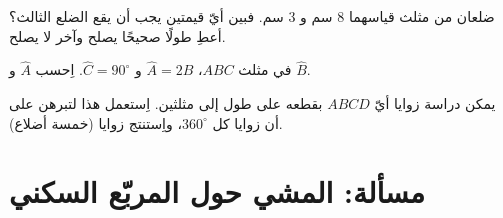 \begin{exercise}[$\star\star$]\label{exo:g7:triangles:9}
ضلعان من مثلث قياسهما $8$ سم و $3$ سم. فبين أيّ قيمتين
يجب أن يقع الضلع الثالث؟ أعطِ طولًا صحيحًا يصلح
وآخر لا يصلح.
\end{exercise}

\begin{exercise}[$\star\star$]\label{exo:g7:triangles:10}
في مثلث $ABC$، $\widehat A = 2\widehat B$ و
$\widehat C = 90^\circ$. اِحسب $\widehat A$ و $\widehat B$.
\end{exercise}

\begin{exercise}[$\star\star\star$]\label{exo:g7:triangles:11}
يمكن دراسة زوايا أيّ  $ABCD$ بقطعه
على طول  إلى مثلثين. اِستعمل هذا لتبرهن على أن
 زوايا كل  $360^\circ$، واِستنتج
 زوايا  (خمسة أضلاع).
\end{exercise}

\section{مسألة: المشي حول المربّع السكني}

